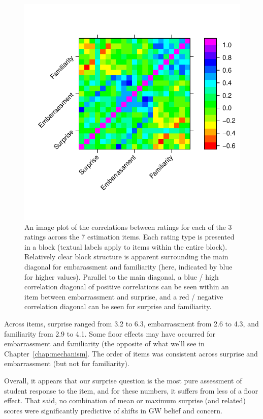 \begin{figure}
    \centering
    \includegraphics{CCO-prondi-surp-corr.pdf}
    \caption{An image plot of the correlations between ratings for each of the 3
        ratings across the 7 estimation items. Each rating type is presented in
        a block (textual labels apply to items within the entire block).
        Relatively clear block structure is apparent surrounding the main
        diagonal for embarassment and familiarity (here, indicated by blue for
        higher values). Parallel to the main diagonal, a blue / high correlation
        diagonal of positive correlations can be seen within an item between
        embarrassment and surprise, and a red / negative correlation diagonal
        can be seen for surprise and familiarity.}
    \label{fig:CCO-prondi-surp-corr}
\end{figure}

Across items, surprise ranged from 3.2 to 6.3, embarrassment from 2.6 to 4.3,
and familiarity from 2.9 to 4.1. Some floor effects may have occurred for
embarrassment and familiarity (the opposite of what we'll see in
Chapter~\ref{chap:mechanism}. The order of items was consistent across
surprise and embarrassment (but not for familiarity). 

Overall, it appears that our surprise question is the most pure assessment of
student response to the item, and for these numbers, it suffers from less of a
floor effect. That said, no combination of mean or maximum surprise (and
related) scores were significantly predictive of shifts in GW belief and
concern.

